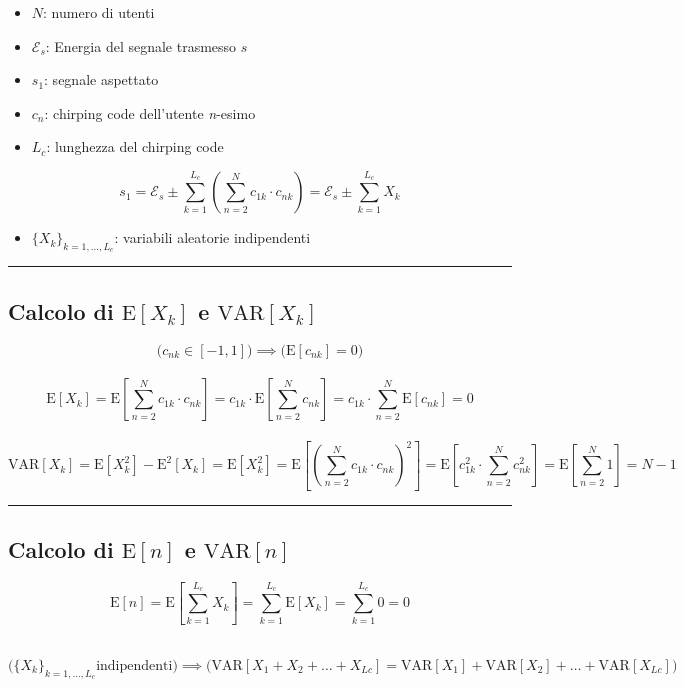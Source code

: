 \begin{itemize}[itemsep=0pt]
	\item $N$: numero di utenti
	\item $\mathcal{E}_s$: Energia del segnale trasmesso $s$ 
	\item $s_1$: segnale aspettato 
	\item $c_n$: chirping code dell'utente \textit{n}-esimo
	\item $L_c$: lunghezza del chirping code
\end{itemize}

\[
s_1 = \mathcal{E}_s \pm \sum_{k=1}^{L_c}\left(\sum_{n=2}^{N}c_{1k}\cdot c_{nk}\right)
= \mathcal{E}_s \pm \sum_{k=1}^{L_c}X_k
\] 

\begin{itemize}[itemsep=0pt]
	\item $\{X_k\}_{k=1,\dots,L_c}$: variabili aleatorie indipendenti
\end{itemize}
\hrule

\subsection{Calcolo di $\mathrm{E}[X_k]$ e $\mathrm{VAR}[X_k]$}
\[
\Bigg( c_{nk}\in [-1,1] \Bigg) \implies \Bigg( \mathrm{E}[c_{nk}] = 0 \Bigg)
\] \\\vspace{-.5cm} \[
\mathrm{\mathrm{E}}[X_k] = \mathrm{E}\left[\sum_{n=2}^{N}c_{1k}\cdot c_{nk}\right] 
= c_{1k}\cdot \mathrm{E}\left[\sum_{n=2}^{N}c_{nk}\right]
= c_{1k}\cdot \sum_{n=2}^{N}\mathrm{E}[c_{nk}] 
= 0
\] \\\vspace{-.5cm} \[
\mathrm{VAR}[X_k] = \mathrm{E}[X_k^2] - \mathrm{E}^2[X_k] = \mathrm{E}[X_k^2] = \mathrm{E}\left[\left(\sum_{n=2}^{N}c_{1k}\cdot c_{nk}\right)^2\right] =
\mathrm{E}\left[ c_{1k}^2\cdot \sum_{n=2}^{N}c_{nk}^2 \right] =
\mathrm{E}\left[ \sum_{n=2}^{N}1 \right] =
N-1
\]
\hrule

\subsection{Calcolo di $\mathrm{E}[n]$ e $\mathrm{VAR}[n]$}
\[
\mathrm{E}[n] = \mathrm{E}\left[ \sum_{k=1}^{L_c}X_k \right] =
\sum_{k=1}^{L_c}\mathrm{E}\left[ X_k \right] = \sum_{k=1}^{L_c}0 = 0
\] \\\vspace{-1.3cm} 

\[
\Bigg( \{X_k\}_{k=1,\dots,L_c}	\text{indipendenti} \Bigg) \implies \Bigg(
\mathrm{VAR}[X_1+X_2+\dots+X_{Lc}] = \mathrm{VAR}[X_1]+\mathrm{VAR}[X_2]+\dots+\mathrm{VAR}[X_{Lc}] \Bigg)
\] \\\vspace{-1.2cm} 

